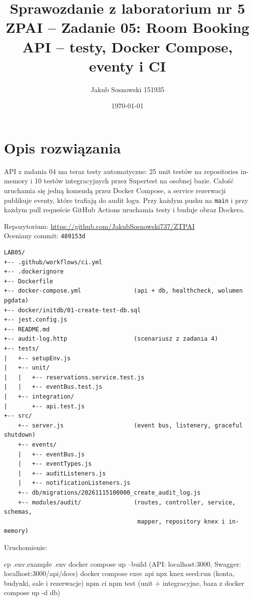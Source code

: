 \documentclass[12pt,a4paper]{article}
\title{Sprawozdanie z laboratorium nr 5\\[6pt]\large ZPAI -- Zadanie 05: Room Booking API -- testy, Docker Compose, eventy i CI}
\author{Jakub Sosnowski 151935}
\date{\today}
\begin{document}
\maketitle

\section*{Opis rozwiązania}

API z zadania 04 ma teraz testy automatyczne: 25 unit testów na repositories in-memory i 10 testów integracyjnych przez Supertest na osobnej bazie. Całość uruchamia się jedną komendą przez Docker Compose, a service rezerwacji publikuje eventy, które trafiają do audit logu. Przy każdym pushu na \texttt{main} i przy każdym pull requeście GitHub Actions uruchamia testy i buduje obraz Dockera.

Repozytorium: \url{https://github.com/JakubSosnowski737/ZTPAI}\\
Oceniany commit: \texttt{489153d}

{\small
\begin{verbatim}
LAB05/
+-- .github/workflows/ci.yml
+-- .dockerignore
+-- Dockerfile
+-- docker-compose.yml               (api + db, healthcheck, wolumen pgdata)
+-- docker/initdb/01-create-test-db.sql
+-- jest.config.js
+-- README.md
+-- audit-log.http                   (scenariusz z zadania 4)
+-- tests/
|   +-- setupEnv.js
|   +-- unit/
|   |   +-- reservations.service.test.js
|   |   +-- eventBus.test.js
|   +-- integration/
|       +-- api.test.js
+-- src/
    +-- server.js                    (event bus, listenery, graceful shutdown)
    +-- events/
    |   +-- eventBus.js
    |   +-- eventTypes.js
    |   +-- auditListeners.js
    |   +-- notificationListeners.js
    +-- db/migrations/20261115100000_create_audit_log.js
    +-- modules/audit/               (routes, controller, service, schemas,
                                      mapper, repository knex i in-memory)
\end{verbatim}
}

Uruchomienie:

\begin{terminal}
cp .env.example .env
docker compose up --build                     (API: localhost:3000, Swagger: localhost:3000/api/docs)
docker compose exec api npx knex seed:run     (konta, budynki, sale i rezerwacje)
npm ci
npm test                                      (unit + integracyjne, baza z docker compose up -d db)
\end{terminal}
\end{document}
